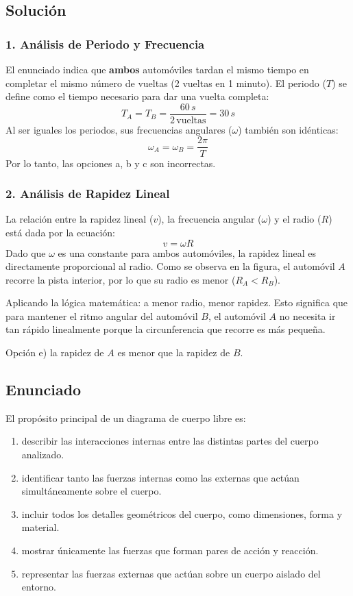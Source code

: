 \documentclass[12pt, a4paper]{article}
\begin{document}
\subsection*{Solución}

\subsubsection*{1. Análisis de Periodo y Frecuencia}
El enunciado indica que \textbf{ambos} automóviles tardan el mismo tiempo en completar el mismo número de vueltas (2 vueltas en 1 minuto).
El periodo ($T$) se define como el tiempo necesario para dar una vuelta completa:
$$ T_A = T_B = \frac{60 \, \si{s}}{2 \, \text{vueltas}} = 30 \, \si{s} $$
Al ser iguales los periodos, sus frecuencias angulares ($\omega$) también son idénticas:
$$ \omega_A = \omega_B = \frac{2\pi}{T} $$
Por lo tanto, las opciones a, b y c son incorrectas.

\subsubsection*{2. Análisis de Rapidez Lineal}
La relación entre la rapidez lineal ($v$), la frecuencia angular ($\omega$) y el radio ($R$) está dada por la ecuación:
$$ v = \omega R $$
Dado que $\omega$ es una constante para ambos automóviles, la rapidez lineal es directamente proporcional al radio. Como se observa en la figura, el automóvil $A$ recorre la pista interior, por lo que su radio es menor ($R_A < R_B$).

Aplicando la lógica matemática: a menor radio, menor rapidez. Esto significa que para mantener el ritmo angular del automóvil $B$, el automóvil $A$ no necesita ir tan rápido linealmente porque la circunferencia que recorre es más pequeña.

\begin{tcolorbox}[colback=green!5!white, colframe=green!50!black, title=Respuesta Final]
\centering Opción e) la rapidez de $A$ es menor que la rapidez de $B$.
\end{tcolorbox}

\newpage

\subsection*{Enunciado}
El propósito principal de un diagrama de cuerpo libre es:
\begin{enumerate}[label=\alph*)]
    \item describir las interacciones internas entre las distintas partes del cuerpo analizado.
    \item identificar tanto las fuerzas internas como las externas que actúan simultáneamente sobre el cuerpo.
    \item incluir todos los detalles geométricos del cuerpo, como dimensiones, forma y material.
    \item mostrar únicamente las fuerzas que forman pares de acción y reacción.
    \item representar las fuerzas externas que actúan sobre un cuerpo aislado del entorno.
\end{enumerate}
\end{document}

